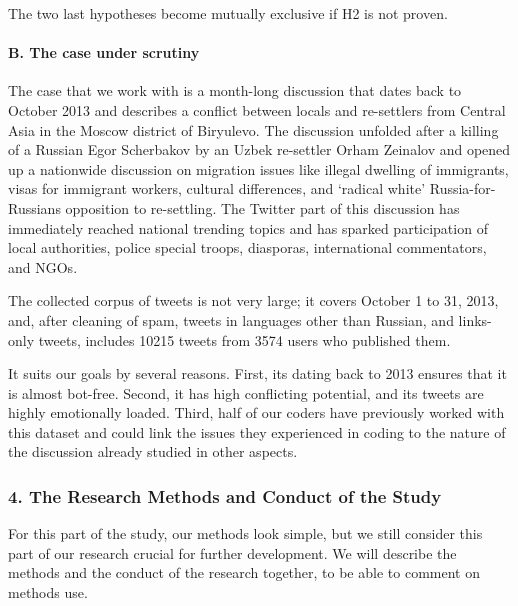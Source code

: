 The two last hypotheses become mutually exclusive if H2 is not proven.

\paragraph{B. The case under scrutiny} 
The case that we work with is a month-long discussion that dates back to October 2013 and describes a conflict between locals and re-settlers from Central Asia in the Moscow district of Biryulevo. The discussion unfolded after a killing of a Russian Egor Scherbakov by an Uzbek re-settler Orham Zeinalov and opened up a nationwide discussion on migration issues like illegal dwelling of immigrants, visas for immigrant workers, cultural differences, and ‘radical white’ Russia-for-Russians opposition to re-settling. The Twitter part of this discussion has immediately reached national trending topics and has sparked participation of local authorities, police special troops, diasporas, international commentators, and NGOs.

The collected corpus of tweets is not very large; it covers October 1 to 31, 2013, and, after cleaning of spam, tweets in languages other than Russian, and links-only tweets, includes 10215 tweets from 3574 users who published them.

It suits our goals by several reasons. First, its dating back to 2013 ensures that it is almost bot-free. Second, it has high conflicting potential, and its tweets are highly emotionally loaded. Third, half of our coders have previously worked with this dataset and could link the issues they experienced in coding to the nature of the discussion already studied in other aspects.

\subsubsection{4. The Research Methods and Conduct of the Study}

For this part of the study, our methods look simple, but we still consider this part of our research crucial for further development. We will describe the methods and the conduct of the research together, to be able to comment on methods use.

